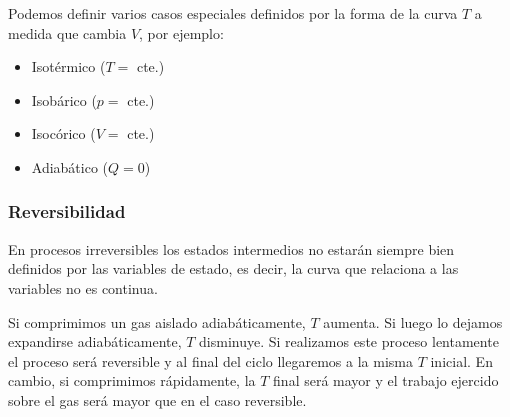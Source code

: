\documentclass[]{article}
\numberwithin{equation}{section}
\newcommand{\0}{\textcolor{gray}{0}}
\begin{document}
Podemos definir varios casos especiales definidos por la forma de la curva $T$ a medida que cambia $V$, por ejemplo:
\begin{itemize}
	\item Isotérmico ($T=$ cte.)
	\item Isobárico ($p=$ cte.)
	\item Isocórico ($V=$ cte.)
	\item Adiabático ($Q=0$)
\end{itemize}

\subsubsection{Reversibilidad}

En procesos irreversibles los estados intermedios no estarán siempre bien definidos por las variables de estado, es decir, la curva que relaciona a las variables no es continua.

Si comprimimos un gas aislado adiabáticamente, $T$ aumenta. Si luego lo dejamos expandirse adiabáticamente, $T$ disminuye. Si realizamos este proceso lentamente el proceso será reversible y al final del ciclo llegaremos a la misma $T$ inicial. En cambio, si comprimimos rápidamente, la $T$ final será mayor y el trabajo ejercido sobre el gas será mayor que en el caso reversible.
\end{document}
